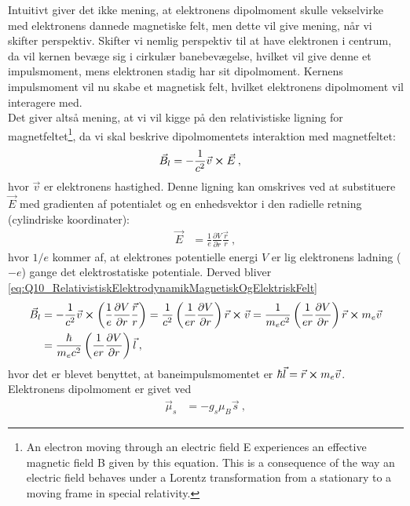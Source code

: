 Intuitivt giver det ikke mening, at elektronens dipolmoment skulle vekselvirke med elektronens dannede magnetiske felt, men dette vil give mening, når vi skifter perspektiv. Skifter vi nemlig perspektiv til at have elektronen i centrum, da vil kernen bevæge sig i cirkulær banebevægelse, hvilket vil give denne et impulsmoment, mens elektronen stadig har sit dipolmoment. Kernens impulsmoment vil nu skabe et magnetisk felt, hvilket elektronens dipolmoment vil interagere med.\\

Det giver altså mening, at vi vil kigge på den relativistiske ligning for magnetfeltet\footnote{An electron moving through an electric
field E experiences an effective magnetic field B given by this equation. This is a consequence of the way an electric field behaves under a Lorentz
transformation from a stationary to a moving frame in special relativity.}, da vi skal beskrive dipolmomentets interaktion med magnetfeltet:
\begin{align} \label{eq:Q10_RelativistiskElektrodynamikMagnetiskOgElektriskFelt}
    \Vec{B}_l &= -\frac{1}{c^2} \Vec{v} \cross \Vec{E} \: ,
\end{align}
hvor $\Vec{v}$ er elektronens hastighed.
Denne ligning kan omskrives ved at substituere $\Vec{E}$ med gradienten af potentialet og en enhedsvektor i den radielle retning (cylindriske koordinater):
\begin{align}
    \Vec{E} &= \frac{1}{e} \frac{\partial V}{\partial r} \frac{\Vec{r}}{r} \: ,
\end{align}
hvor $1/e$ kommer af, at elektrones potentielle energi $V$ er lig elektronens ladning ($-e$) gange det elektrostatiske potentiale. Derved bliver \cref{eq:Q10_RelativistiskElektrodynamikMagnetiskOgElektriskFelt}
\begin{align}
    \Vec{B}_l &= -\frac{1}{c^2} \Vec{v} \cross \left(\frac{1}{e} \frac{\partial V}{\partial r} \frac{\Vec{r}}{r}\right) = \frac{1}{c^2} \left(\frac{1}{e r} \frac{\partial V}{\partial r} \right) \Vec{r} \cross \Vec{v} = \frac{1}{m_e c^2} \left(\frac{1}{e r} \frac{\partial V}{\partial r} \right) \Vec{r} \cross m_e \Vec{v} \nonumber\\
    &= \frac{\hbar}{m_e c^2} \left(\frac{1}{e r} \frac{\partial V}{\partial r} \right) \Vec{l} \: ,
\end{align}
hvor det er blevet benyttet, at baneimpulsmomentet er $\hbar \Vec{l} = \Vec{r} \cross m_e \Vec{v}$.\\
Elektronens dipolmoment er givet ved
\begin{align} \label{eq:Q10_DipoleMomentOfAnElectron}
    \Vec{\mu}_s &= - g_s \mu_B \Vec{s} \: ,
\end{align}
